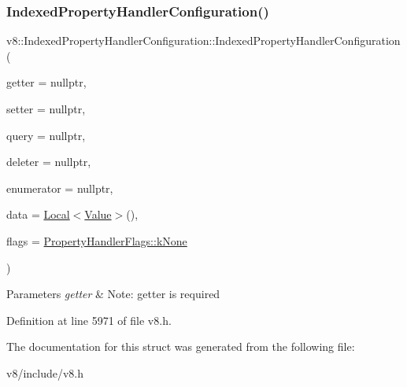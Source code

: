 \subsubsection{\texorpdfstring{Indexed\+Property\+Handler\+Configuration()}{IndexedPropertyHandlerConfiguration()}}
{\footnotesize\ttfamily v8\+::\+Indexed\+Property\+Handler\+Configuration\+::\+Indexed\+Property\+Handler\+Configuration (\begin{DoxyParamCaption}\item[{\mbox{\hyperlink{namespacev8_a48e7816ba64447bf32a25d194588daaf}{Indexed\+Property\+Getter\+Callback}}}]{getter = {\ttfamily nullptr},  }\item[{\mbox{\hyperlink{namespacev8_a4ac7cc6185ebc8b6a199f9fa8e6bf5c3}{Indexed\+Property\+Setter\+Callback}}}]{setter = {\ttfamily nullptr},  }\item[{\mbox{\hyperlink{namespacev8_a980b62c33eb664783e61e25c3b27f9ee}{Indexed\+Property\+Query\+Callback}}}]{query = {\ttfamily nullptr},  }\item[{\mbox{\hyperlink{namespacev8_a53863728de14cde48dd6543207b2f2da}{Indexed\+Property\+Deleter\+Callback}}}]{deleter = {\ttfamily nullptr},  }\item[{\mbox{\hyperlink{namespacev8_adbb0a6d5537371953f9ba807d4f6275e}{Indexed\+Property\+Enumerator\+Callback}}}]{enumerator = {\ttfamily nullptr},  }\item[{\mbox{\hyperlink{classv8_1_1Local}{Local}}$<$ \mbox{\hyperlink{classv8_1_1Value}{Value}} $>$}]{data = {\ttfamily \mbox{\hyperlink{classv8_1_1Local}{Local}}$<$\mbox{\hyperlink{classv8_1_1Value}{Value}}$>$()},  }\item[{\mbox{\hyperlink{namespacev8_af4789f0aeb8680e353901a35810cac1a}{Property\+Handler\+Flags}}}]{flags = {\ttfamily \mbox{\hyperlink{namespacev8_af4789f0aeb8680e353901a35810cac1aa35c3ace1970663a16e5c65baa5941b13}{Property\+Handler\+Flags\+::k\+None}}} }\end{DoxyParamCaption})\hspace{0.3cm}{\ttfamily [inline]}}


\begin{DoxyParams}{Parameters}
{\em getter} & Note\+: getter is required \\
\hline
\end{DoxyParams}


Definition at line 5971 of file v8.\+h.



The documentation for this struct was generated from the following file\+:\begin{DoxyCompactItemize}
\item 
v8/include/v8.\+h\end{DoxyCompactItemize}
